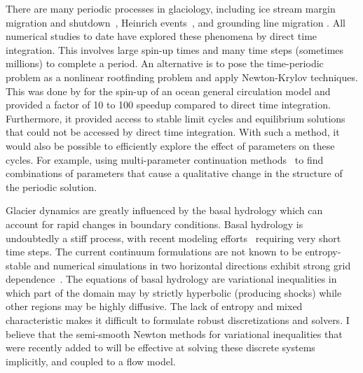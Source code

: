 There are many periodic processes in glaciology, including ice stream margin migration and shutdown~\citep{raymond2000energy,bueler2009shallow}, Heinrich events~\citep{heinrich1988cyclic,calov2010heino}, and grounding line migration \citep{schoof2007isg,mismip}.
All numerical studies to date have explored these phenomena by direct time integration.
This involves large spin-up times and many time steps (sometimes millions) to complete a period.
An alternative is to pose the time-periodic problem as a nonlinear rootfinding problem and apply Newton-Krylov techniques.
This was done by \citep{merlis2008fast} for the spin-up of an ocean general circulation model and provided a factor of 10 to 100 speedup compared to direct time integration.
Furthermore, it provided access to stable limit cycles and equilibrium solutions that could not be accessed by direct time integration.
With such a method, it would also be possible to efficiently explore the effect of parameters on these cycles.
For example, using multi-parameter continuation methods~\citep{allgower2003inc} to find combinations of parameters that cause a qualitative change in the structure of the periodic solution.

Glacier dynamics are greatly influenced by the basal hydrology which can account for rapid changes in boundary conditions.
Basal hydrology is undoubtedly a stiff process, with recent modeling efforts~\citep[\eg][]{pimentel2010hydrologically,pimentel2011numerical} requiring very short time steps.
The current continuum formulations are not known to be entropy-stable and numerical simulations in two horizontal directions exhibit strong grid dependence~\citep{schoof2010ice}.
The equations of basal hydrology are variational inequalities in which part of the domain may by strictly hyperbolic (\eg producing shocks) while other regions may be highly diffusive.
The lack of entropy and mixed characteristic makes it difficult to formulate robust discretizations and solvers.
I believe that the semi-smooth Newton methods for variational inequalities that were recently added to {\PETSc} will be effective at solving these discrete systems implicitly, and coupled to a flow model.

